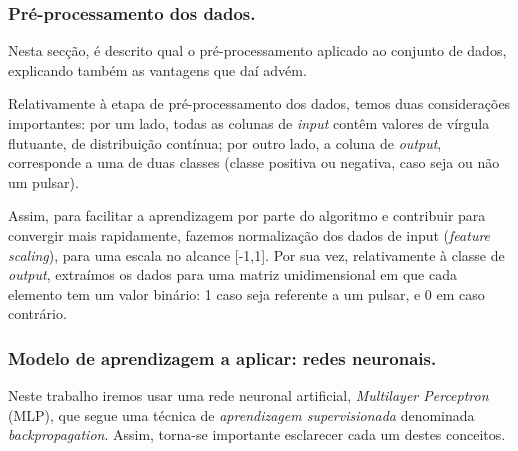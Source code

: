 \documentclass[]{article}
\begin{document}

\subsubsection{Pré-processamento dos dados.}
	Nesta secção, é descrito qual o pré-processamento aplicado ao conjunto de dados, explicando também as vantagens que daí advém.

	Relativamente à etapa de pré-processamento dos dados, temos duas considerações importantes: por um lado, todas as colunas de \textit{input} contêm valores de vírgula flutuante, de distribuição contínua; por outro lado, a coluna de \textit{output}, corresponde a uma de duas classes (classe positiva ou negativa, caso seja ou não um pulsar).
    
    Assim, para facilitar a aprendizagem por parte do algoritmo e contribuir para convergir mais rapidamente, fazemos normalização dos dados de input (\textit{feature scaling}), para uma escala no alcance [-1,1]. Por sua vez, relativamente à classe de \textit{output}, extraímos os dados para uma matriz unidimensional em que cada elemento tem um valor binário: 1 caso seja referente a um pulsar, e 0 em caso contrário.

\subsubsection{Modelo de aprendizagem a aplicar: redes neuronais.}
	Neste trabalho iremos usar uma rede neuronal artificial, \textit{Multilayer Perceptron} (MLP), que segue uma técnica de \textit{aprendizagem supervisionada} denominada \textit{backpropagation}. Assim, torna-se importante esclarecer cada um destes conceitos.
\end{document}
